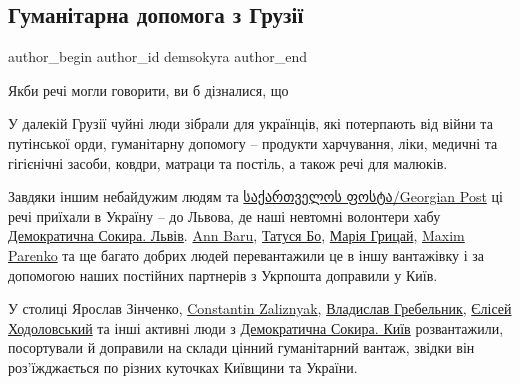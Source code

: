  
 
 
 
 
 
\subsection{Гуманітарна допомога з Грузії}
\label{sec:08_05_2022.fb.demsokyra.1.gumdopomoga_gruzia}
 
\ifcmt
 author_begin
   author_id demsokyra
 author_end
\fi

Якби речі могли говорити, ви б дізналися, що

У далекій Грузії чуйні люди зібрали для українців, які потерпають від війни та
путінської орди, гуманітарну допомогу – продукти харчування, ліки, медичні та
гігієнічні засоби, ковдри, матраци та постіль, а також речі для малюків.


Завдяки іншим небайдужим людям та
\href{https://www.facebook.com/gpost.ge}{საქართველოს ფოსტა/Georgian Post} ці
речі приїхали в Україну – до Львова, де наші невтомні волонтери хабу
\href{https://www.facebook.com/sokyra.space.lviv}{Демократична Сокира. Львів}.
\href{https://www.facebook.com/ann.baru}{Ann Baru},
\href{https://www.facebook.com/tatusjaBo}{Татуся Бо},
\href{https://www.facebook.com/GritsayMariya}{Марія Грицай},
\href{https://www.facebook.com/maxparenko}{Maxim Parenko} та ще багато добрих
людей перевантажили це в іншу вантажівку і за допомогою наших постійних
партнерів з Укрпошта доправили у Київ.


У столиці Ярослав Зінченко,
\href{https://www.facebook.com/profile.php?id=100011140721506}{Constantin
Zaliznyak}, \href{https://www.facebook.com/hrebelnyk}{Владислав Гребельник}, 
\href{https://www.facebook.com/khodolovskiy}{Єлісей Ходоловський} та інші активні люди з
\href{https://www.facebook.com/sokyra.space.kyiv}{Демократична Сокира. Київ} розвантажили, посортували й доправили на склади
цінний гуманітарний вантаж, звідки він роз'їжджається по різних куточках
Київщини та України.

